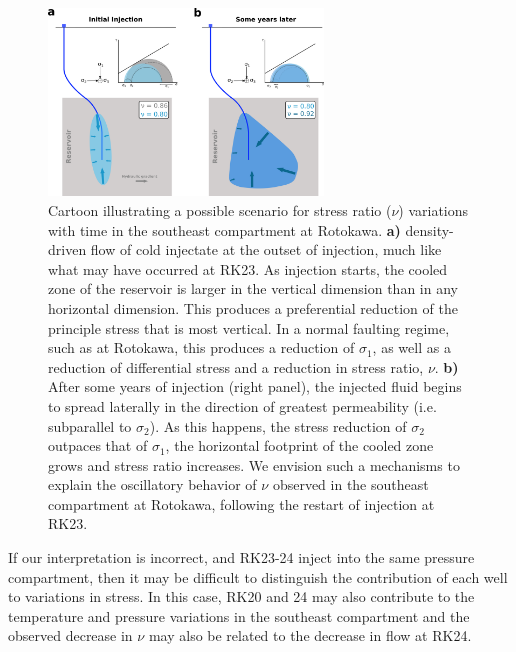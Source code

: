 \begin{figure}
\begin{center}
\includegraphics[width=0.65\textwidth,height=0.8\textheight,keepaspectratio]{Chapter_5_FMs/figures/cooling_schematic/res_cooling_schematic}
\caption[Effect of thermoelastic cooling on the reservoir stress state]{{
Cartoon illustrating a possible scenario for stress ratio ($\nu$) variations with time in the southeast compartment at Rotokawa. \textbf{a)} density-driven flow of cold injectate at the outset of injection, much like what may have occurred at RK23. As injection starts, the cooled zone of the reservoir is larger in the vertical dimension than in any horizontal dimension. This produces a preferential reduction of the principle stress that is most vertical. In a normal faulting regime, such as at Rotokawa, this produces a reduction of $\sigma_{1}$, as well as a reduction of differential stress and a reduction in stress ratio, $\nu$. \textbf{b)} After some years of injection (right panel), the injected fluid begins to spread laterally in the direction of greatest \gls{permeability} (i.e. subparallel to $\sigma_{2}$). As this happens, the stress reduction of $\sigma_{2}$ outpaces that of $\sigma_{1}$, the horizontal footprint of the cooled zone grows and stress ratio increases. We envision such a mechanisms to explain the oscillatory behavior of $\nu$ observed in the southeast compartment at Rotokawa, following the restart of injection at RK23. 
{\label{cooling}}%
}}
\end{center}
\end{figure}

If our interpretation is incorrect, and RK23-24 inject into the same pressure compartment, then it may be difficult to distinguish the contribution of each well to variations in stress. In this case, RK20 and 24 may also contribute to the temperature and pressure variations in the southeast compartment and the observed decrease in $\nu$ may also be related to the decrease in flow at RK24.

